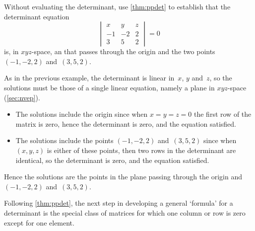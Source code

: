 \begin{example} \label{eg:planeq}
Without evaluating the determinant, use \cref{thm:ppdet} to establish that the determinant equation
\begin{equation*}
\begin{vmatrix} x&y&z\\-1&-2&2\\3&5&2 \end{vmatrix}=0
\end{equation*}
is, in \(xyz\)-space, an  that passes through the origin and the two points \((-1,-2,2)\) and~\((3,5,2)\).
\begin{solution} 
As in the previous example, the determinant is linear in~\(x\), \(y\) and~\(z\), so the solutions must be those of a single linear equation, namely a plane in \(xyz\)-space (\cref{sec:nvep}).
\begin{itemize}
\item The solutions include the origin since when \(x=y=z=0\) the first row of the matrix is zero, hence the determinant is zero, and the equation satisfied.
\item The solutions include the  points \((-1,-2,2)\) and~\((3,5,2)\) since when \((x,y,z)\) is either of these points, then two rows in the determinant are identical, so the determinant is zero, and the equation satisfied.
\end{itemize}
Hence the solutions are the points in the plane passing through the origin and \((-1,-2,2)\) and~\((3,5,2)\).
\end{solution}
\end{example}






Following \cref{thm:ppdet}, the next step in developing a general `formula' for a determinant is the special class of matrices for which one column or row is zero except for one element.



